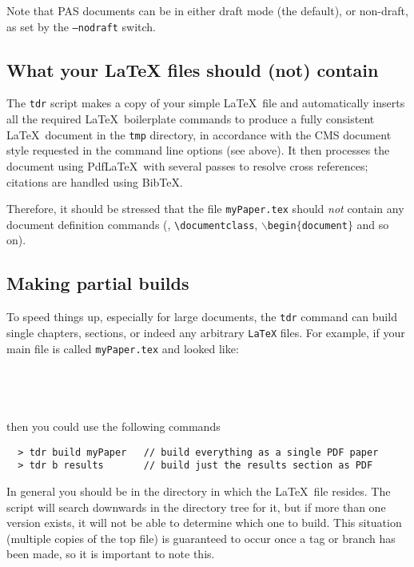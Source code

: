 Note that PAS documents can be in either draft mode (the default), or non-draft,
as set by the \texttt{--nodraft} switch.

\subsection{What your \texorpdfstring{\LaTeX}{LaTeX} files should (not) contain}

%

The \texttt{tdr} script makes a copy of your simple \LaTeX\ file
and automatically inserts all the required \LaTeX\ boilerplate
commands to produce a fully consistent \LaTeX\ document in the
\texttt{tmp} directory, in accordance with the CMS document
style requested in the command line options (see above).
It then processes the document using Pdf\LaTeX\ with several passes
to resolve cross references; citations are handled using BibTeX.
%

Therefore, it should be stressed that the file \texttt{myPaper.tex}
should \emph{not} contain any document definition commands (\eg,
\texttt{\textbackslash{}documentclass},
$\backslash${\texttt{begin$\lbrace$document}}$\rbrace$
and so on).

\subsection{Making partial builds}
%
To speed things up, especially for large documents, the \texttt{tdr}
command can build single chapters, sections, or indeed any
arbitrary \texttt{\LaTeX} files.
For example, if your main file is called \texttt{myPaper.tex}
and looked like:
%
\vspace*{-2.5ex}\begin{verbatim}




\end{verbatim}
%
then you could use the following commands
%
\vspace*{-2.5ex}\begin{verbatim}
  > tdr build myPaper   // build everything as a single PDF paper
  > tdr b results       // build just the results section as PDF
\end{verbatim}
%
In general you should be in the directory in which the
\LaTeX\ file resides. The script will search downwards in the directory tree for it, but if more than one version exists, it will not be able to determine which one to build. This situation (multiple copies of the top file) is guaranteed to occur once a tag or branch has been made, so it is important to note this.

